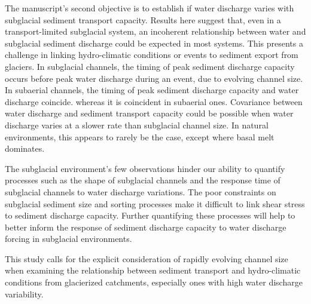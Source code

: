 \documentclass[esurf, manuscript]{copernicus}
\begin{document}
The manuscript's second objective is to establish if water discharge varies with subglacial sediment transport capacity.
Results here suggest that, even in a transport-limited subglacial system, an incoherent relationship between water and subglacial sediment discharge could be expected in most systems.
This presents a challenge in linking hydro-climatic conditions or events to sediment export from glaciers.
In subglacial channels, the timing of peak sediment discharge capacity occurs before peak water discharge during an event, due to evolving channel size.
In subaerial channels, the timing of peak sediment discharge capacity and water discharge coincide.
whereas it is coincident in subaerial ones.
Covariance between water discharge and sediment transport capacity could be possible when water discharge varies at a slower rate than subglacial channel size.
In natural environments, this appears to rarely be the case, except where basal melt dominates.

The subglacial environment's few observations hinder our ability to quantify processes such as
the shape of subglacial channels and the response time of subglacial channels to water discharge variations.
The poor constraints on subglacial sediment size and sorting processes make it difficult to link shear stress to sediment discharge capacity.
Further quantifying these processes will help to better inform the response of sediment discharge capacity to water discharge forcing in subglacial environments.

This study calls for the explicit consideration of rapidly evolving channel size when examining the relationship between sediment transport and hydro-climatic conditions from glacierized catchments, especially ones with high water discharge variability.


\end{document}
